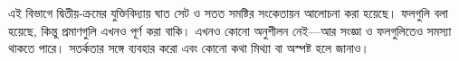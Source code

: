 \documentclass[../../../include/open-logic-chapter]{subfiles}
\begin{document}

\begin{editorial}
এই বিভাগে দ্বিতীয়-ক্রমের যুক্তিবিদ্যায় ঘাত সেট ও সতত সমষ্টির
সংকেতায়ন আলোচনা করা হয়েছে। ফলগুলি বলা হয়েছে, কিন্তু প্রমাণগুলি এখনও
পূর্ণ করা বাকি। এখনও কোনো অনুশীলন নেই---আর সংজ্ঞা ও ফলগুলিতেও সমস্যা
থাকতে পারে। সতর্কতার সঙ্গে ব্যবহার করো এবং কোনো কথা মিথ্যা বা অস্পষ্ট
হলে জানাও।
\end{editorial}





\OLEndChapterHook
\end{document}
